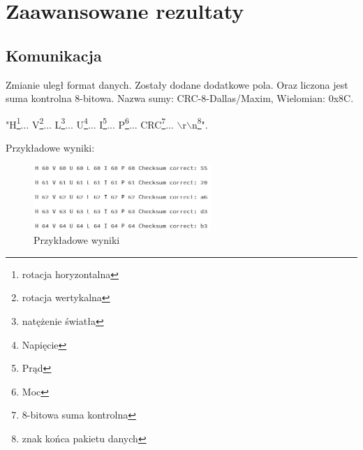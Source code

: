 \documentclass[10pt, a4paper]{article}
\begin{document}
\section{Zaawansowane rezultaty}
	\subsection{Komunikacja}
	Zmianie uległ format danych. Zostały dodane dodatkowe pola. Oraz liczona jest suma kontrolna 8-bitowa. Nazwa sumy: CRC-8-Dallas/Maxim, Wielomian: 0x8C.
		\begin{center}
			"H\footnote{rotacja horyzontalna}... V\footnote{rotacja wertykalna}... L\footnote{natężenie światła}... U\footnote{Napięcie}... I\footnote{Prąd}... P\footnote{Moc}... CRC\footnote{8-bitowa suma kontrolna}... $\backslash$r$\backslash$n\footnote{znak końca pakietu danych}".
		\end{center}
	Przykładowe wyniki:
		\begin{figure}[H]
			\centering
			\includegraphics[width=0.6\textwidth]{figures/serial_wyniki.png}
			\caption{Przykładowe wyniki}
			\label{fig:serial_wyniki}
		\end{figure}
\end{document}
